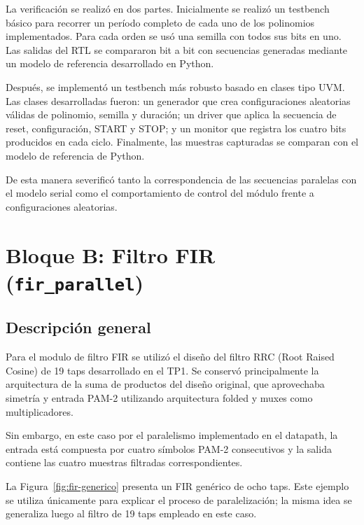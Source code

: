 \documentclass[10pt,a4paper]{article}
\begin{document}
La verificación se realizó en dos partes. Inicialmente se realizó un testbench básico
para recorrer un período completo de cada uno de los polinomios implementados. Para
cada orden se usó una semilla con todos sus bits en uno. Las salidas del RTL se 
compararon bit a bit con secuencias generadas mediante un modelo de referencia 
desarrollado en Python.

Después, se implementó un testbench más robusto basado en clases tipo UVM. Las clases 
desarrolladas fueron: un generador que crea configuraciones aleatorias válidas de polinomio, 
semilla  y duración; un driver que aplica  la secuencia de reset, configuración, START y 
STOP; y un  monitor que registra los cuatro  bits producidos en cada ciclo. Finalmente, 
las muestras capturadas se comparan con el modelo  de referencia de Python. 

De esta manera severificó tanto la correspondencia de las secuencias paralelas con el modelo 
serial como el comportamiento de control del módulo frente a configuraciones aleatorias.

\section{Bloque B: Filtro FIR (\texttt{fir\_parallel})}
\label{sec:fir}

\subsection{Descripción general}

Para el modulo de filtro FIR se utilizó el diseño del filtro RRC (Root Raised Cosine) de 19 
taps desarrollado en el TP1. Se conservó principalmente la arquitectura de la suma de 
productos del diseño original, que aprovechaba simetría y entrada PAM-2 utilizando 
arquitectura folded y muxes como multiplicadores.

Sin embargo, en este caso por el paralelismo implementado en el datapath, la entrada está 
compuesta por cuatro símbolos PAM-2 consecutivos y la salida contiene las cuatro muestras 
filtradas correspondientes.

La Figura~\ref{fig:fir-generico} presenta un FIR genérico de ocho taps. Este ejemplo
se utiliza únicamente para explicar el proceso de paralelización; la misma idea se
generaliza luego al filtro de 19 taps empleado en este caso.
\end{document}
